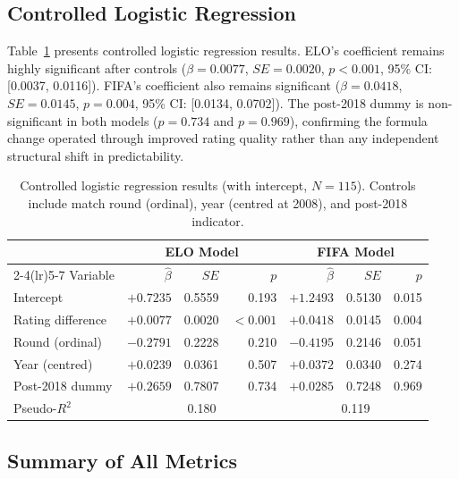 \documentclass[12pt, a4paper]{article}
\begin{document}
\subsection{Controlled Logistic Regression}

Table~\ref{tab:controlled} presents controlled logistic regression results. ELO's coefficient
remains highly significant after controls ($\beta = 0.0077$, $SE = 0.0020$, $p < 0.001$,
95\% CI: [0.0037, 0.0116]). FIFA's coefficient also remains significant ($\beta = 0.0418$,
$SE = 0.0145$, $p = 0.004$, 95\% CI: [0.0134, 0.0702]). The post-2018 dummy is
non-significant in both models ($p = 0.734$ and $p = 0.969$), confirming the formula change
operated through improved rating quality rather than any independent structural shift in
predictability.

\begin{table}[H]
  \centering
  \caption{Controlled logistic regression results (with intercept, $N = 115$). Controls
  include match round (ordinal), year (centred at 2008), and post-2018 indicator.}
  \label{tab:controlled}
  \begin{tabular}{lrrrrrr}
    \toprule
    & \multicolumn{3}{c}{\textbf{ELO Model}} & \multicolumn{3}{c}{\textbf{FIFA Model}} \\
    \cmidrule(lr){2-4}\cmidrule(lr){5-7}
    Variable & $\hat{\beta}$ & $SE$ & $p$ & $\hat{\beta}$ & $SE$ & $p$ \\
    \midrule
    Intercept          & $+0.7235$ & 0.5559 & 0.193 & $+1.2493$ & 0.5130 & 0.015 \\
    Rating difference  & $+0.0077$ & 0.0020 & $<0.001$ & $+0.0418$ & 0.0145 & 0.004 \\
    Round (ordinal)    & $-0.2791$ & 0.2228 & 0.210 & $-0.4195$ & 0.2146 & 0.051 \\
    Year (centred)     & $+0.0239$ & 0.0361 & 0.507 & $+0.0372$ & 0.0340 & 0.274 \\
    Post-2018 dummy    & $+0.2659$ & 0.7807 & 0.734 & $+0.0285$ & 0.7248 & 0.969 \\
    \midrule
    Pseudo-$R^{2}$     & \multicolumn{3}{c}{0.180} & \multicolumn{3}{c}{0.119} \\
    \bottomrule
  \end{tabular}
\end{table}

\subsection{Summary of All Metrics}
\end{document}
